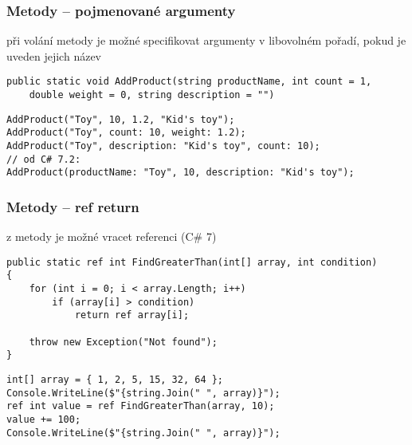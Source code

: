 \begin{frame}[fragile]
\frametitle{Metody -- pojmenované argumenty}
\begin{bitemize}{}
\item při volání metody je možné specifikovat argumenty v libovolném pořadí, pokud je uveden jejich název
\end{bitemize}
\vfill
\begin{yesblock}
\begin{lstlisting}[basicstyle=\small]
public static void AddProduct(string productName, int count = 1, 
    double weight = 0, string description = "")
\end{lstlisting}
\end{yesblock}
\vfill
\begin{yesblock}
\begin{lstlisting}[basicstyle=\small]
AddProduct("Toy", 10, 1.2, "Kid's toy");
AddProduct("Toy", count: 10, weight: 1.2);
AddProduct("Toy", description: "Kid's toy", count: 10);
// od C# 7.2:
AddProduct(productName: "Toy", 10, description: "Kid's toy"); 
\end{lstlisting}
\end{yesblock}
\end{frame}




\begin{frame}[fragile]
\frametitle{Metody -- ref return}

\begin{bitemize}{}
\item z metody je možné vracet referenci (C\# 7)
\end{bitemize}
\vfill
\begin{yesblock}
\begin{lstlisting}[basicstyle=\small]
public static ref int FindGreaterThan(int[] array, int condition)
{
    for (int i = 0; i < array.Length; i++)
        if (array[i] > condition)
            return ref array[i];

    throw new Exception("Not found");
}
\end{lstlisting}
\end{yesblock}
\vfill
\begin{yesblock}
\begin{lstlisting}[basicstyle=\small]
int[] array = { 1, 2, 5, 15, 32, 64 };
Console.WriteLine($"{string.Join(" ", array)}");
ref int value = ref FindGreaterThan(array, 10);
value += 100;
Console.WriteLine($"{string.Join(" ", array)}");
\end{lstlisting}
\end{yesblock}
\end{frame}





